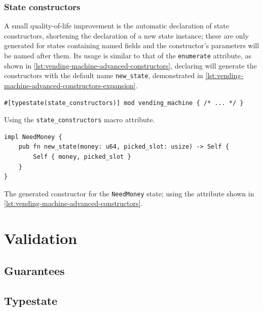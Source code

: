 \subsubsection{State constructors}

A small quality-of-life improvement is the automatic declaration of state constructors,
shortening the declaration of a new state instance;
these are only generated for states containing named fields and
the constructor's parameters will be named after them. %
Its usage is similar to that of the \texttt{enumerate} attribute, as shown in \autoref{lst:vending-machine-advanced-constructors},
declaring  will generate the constructors with the default name \texttt{new\_state},
demonstrated in \autoref{lst:vending-machine-advanced-constructors-expansion}.

\begin{listing}
    \begin{verbatim}
#[typestate(state_constructors)] mod vending_machine { /* ... */ }
    \end{verbatim}
    \caption{Using the \texttt{state\_constructors} macro attribute.}
    \label{lst:vending-machine-advanced-constructors}
\end{listing}


\begin{listing}
    \begin{verbatim}
impl NeedMoney {
    pub fn new_state(money: u64, picked_slot: usize) -> Self {
        Self { money, picked_slot }
    }
}
    \end{verbatim}
    \caption{
        The generated constructor for the \texttt{NeedMoney} state;
        using the attribute shown in \autoref{lst:vending-machine-advanced-constructors}.
    }
    \label{lst:vending-machine-advanced-constructors-expansion}
\end{listing}



\section{Validation}\label{sec:validation}

\subsection{Guarantees}\label{sec:validation:guarantees}

\subsection{Typestate}\label{sec:validation:typestate}

